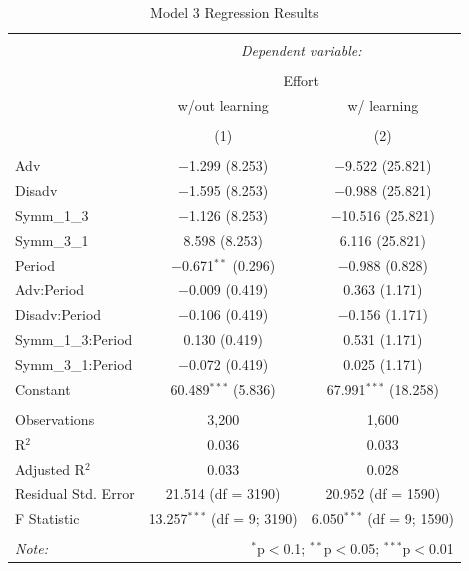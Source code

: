 \documentclass[AER]{AEA}
\begin{document}
\begin{table}[!htbp] \centering 
  \caption{Model 3 Regression Results} 
  \label{Tab:regression_3} 
\begin{tabular}{@{\extracolsep{5pt}}lcc} 
\\[-1.8ex]\hline 
\hline \\[-1.8ex] 
 & \multicolumn{2}{c}{\textit{Dependent variable:}} \\ 
\cline{2-3} 
\\[-1.8ex] & \multicolumn{2}{c}{Effort} \\ 
 & w/out learning & w/ learning \\ 
\\[-1.8ex] & (1) & (2)\\ 
\hline \\[-1.8ex] 
 Adv & $-$1.299 (8.253) & $-$9.522 (25.821) \\ 
  Disadv & $-$1.595 (8.253) & $-$0.988 (25.821) \\ 
  Symm\_1\_3 & $-$1.126 (8.253) & $-$10.516 (25.821) \\ 
  Symm\_3\_1 & 8.598 (8.253) & 6.116 (25.821) \\ 
  Period & $-$0.671$^{**}$ (0.296) & $-$0.988 (0.828) \\ 
  Adv:Period & $-$0.009 (0.419) & 0.363 (1.171) \\ 
  Disadv:Period & $-$0.106 (0.419) & $-$0.156 (1.171) \\ 
  Symm\_1\_3:Period & 0.130 (0.419) & 0.531 (1.171) \\ 
  Symm\_3\_1:Period & $-$0.072 (0.419) & 0.025 (1.171) \\ 
  Constant & 60.489$^{***}$ (5.836) & 67.991$^{***}$ (18.258) \\ 
 \hline \\[-1.8ex] 
Observations & 3,200 & 1,600 \\ 
R$^{2}$ & 0.036 & 0.033 \\ 
Adjusted R$^{2}$ & 0.033 & 0.028 \\ 
Residual Std. Error & 21.514 (df = 3190) & 20.952 (df = 1590) \\ 
F Statistic & 13.257$^{***}$ (df = 9; 3190) & 6.050$^{***}$ (df = 9; 1590) \\ 
\hline 
\hline \\[-1.8ex] 
\textit{Note:}  & \multicolumn{2}{r}{$^{*}$p$<$0.1; $^{**}$p$<$0.05; $^{***}$p$<$0.01} \\ 
\end{tabular} 
\end{table} 
\end{document}
